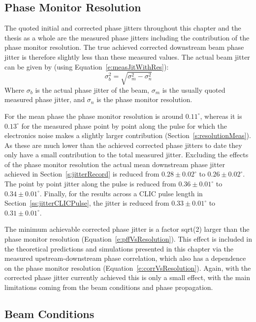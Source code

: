 \subsection{Phase Monitor Resolution}
\label{ss:longFF_phMonRes}

The quoted initial and corrected phase jitters throughout this chapter and the thesis as a whole are the measured phase jitters including the contribution of the phase monitor resolution. The true achieved corrected downstream beam phase jitter is therefore slightly less than these measured values. The actual beam jitter can be given by (using Equation~\ref{e:measJitWithRes}):
\begin{equation}
\sigma_b^2 = \sqrt{\sigma_m^2 - \sigma_n^2}
\end{equation}
Where \(\sigma_b\) is the actual phase jitter of the beam, \(\sigma_m\) is the usually quoted measured phase jitter, and \(\sigma_n\) is the phase monitor resolution.

For the mean phase the phase monitor resolution is around \(0.11^\circ\), whereas it is \(0.13^\circ\) for the measured phase point by point along the pulse for which the electronics noise makes a slightly larger contribution (Section~\ref{s:resolutionMeas}). As these are much lower than the achieved corrected phase jitters to date they only have a small contribution to the total measured jitter. Excluding the effects of the phase monitor resolution the actual mean downstream phase jitter achieved in Section~\ref{s:jitterRecord} is reduced from \(0.28\pm0.02^\circ\) to \(0.26\pm0.02^\circ\). The point by point jitter along the pulse is reduced from \(0.36\pm0.01^\circ\) to \(0.34\pm0.01^\circ\). Finally, for the results across a CLIC pulse length in Section~\ref{ss:jitterCLICPulse}, the jitter is reduced from \(0.33\pm0.01^\circ\) to \(0.31\pm0.01^\circ\).

The minimum achievable corrected phase jitter is a factor sqrt(2) larger than the phase monitor resolution (Equation~\ref{e:pffVsResolution}). This effect is included in the theoretical predictions and simulations presented in this chapter via the measured upstream-downstream phase correlation, which also has a dependence on the phase monitor resolution (Equation~\ref{e:corrVsResolution}). Again, with the corrected phase jitter currently achieved this is only a small effect, with the main limitations coming from the beam conditions and phase propagation.


\subsection{Beam Conditions}
\label{ss:longFF_beamConds}

